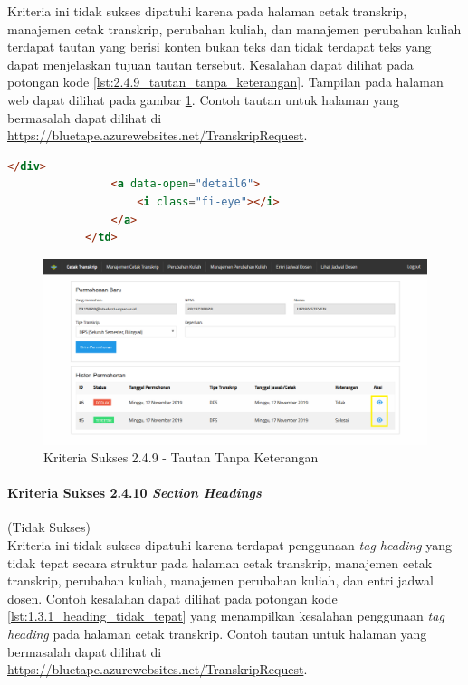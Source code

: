 \documentclass[a4paper,twoside]{article}
\begin{document}
\begin{enumerate}
		Kriteria ini tidak sukses dipatuhi karena pada halaman cetak transkrip, manajemen cetak transkrip, perubahan kuliah, dan manajemen perubahan kuliah terdapat tautan yang berisi konten bukan teks dan tidak terdapat teks yang dapat menjelaskan tujuan tautan tersebut. Kesalahan dapat dilihat pada potongan kode \ref{lst:2.4.9_tautan_tanpa_keterangan}. Tampilan pada halaman web dapat dilihat pada gambar \ref{fig:2.4.9_link_purpose_link_only}. Contoh tautan untuk halaman yang bermasalah dapat dilihat di \url{https://bluetape.azurewebsites.net/TranskripRequest}.

		\begin{lstlisting}[frame=single, label={lst:2.4.9_tautan_tanpa_keterangan}, language=HTML, caption=Kriteria Sukses 2.4.9 - Tautan Tanpa Keterangan]
				</div>
				<a data-open="detail6">
					<i class="fi-eye"></i>
				</a>
			</td>
		\end{lstlisting}

		\begin{figure}[H]
			\centering  
			\includegraphics[scale=0.3, frame]{kriteria-sukses-2-4-9-link-purpose-link-only}  
			\caption[Kriteria Sukses 2.4.9 - Tautan Tanpa Keterangan]{Kriteria Sukses 2.4.9 - Tautan Tanpa Keterangan}
			\label{fig:2.4.9_link_purpose_link_only}  
		\end{figure} 
		
		\paragraph{Kriteria Sukses 2.4.10 \textit{Section Headings}}
		\label{par:kepatuhan_bluetape_kriteria_sukses_2.4.10}
		(Tidak Sukses)\\

		Kriteria ini tidak sukses dipatuhi karena terdapat penggunaan \textit{tag heading} yang tidak tepat secara struktur pada halaman cetak transkrip, manajemen cetak transkrip, perubahan kuliah, manajemen perubahan kuliah, dan entri jadwal dosen. Contoh kesalahan dapat dilihat pada potongan kode \ref{lst:1.3.1_heading_tidak_tepat} yang menampilkan kesalahan penggunaan \textit{tag heading} pada halaman cetak transkrip. Contoh tautan untuk halaman yang bermasalah dapat dilihat di \url{https://bluetape.azurewebsites.net/TranskripRequest}.


\end{enumerate}
\end{document}
